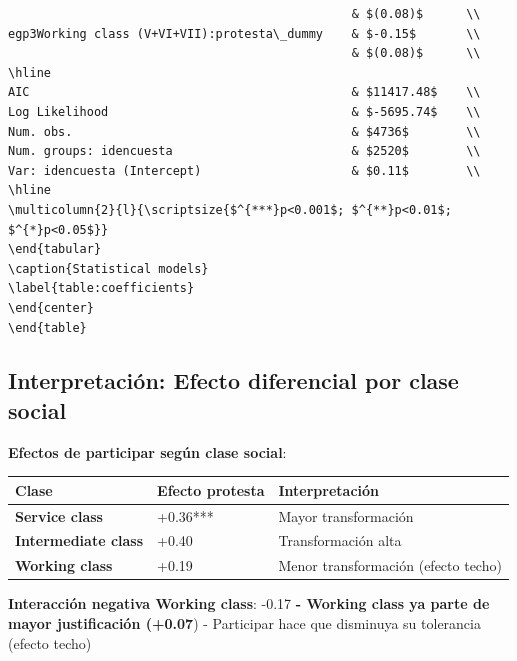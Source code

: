 \documentclass[
  12pt,
]{article}
\begin{document}
\begin{verbatim}
                                                & $(0.08)$      \\
egp3Working class (V+VI+VII):protesta\_dummy    & $-0.15$       \\
                                                & $(0.08)$      \\
\hline
AIC                                             & $11417.48$    \\
Log Likelihood                                  & $-5695.74$    \\
Num. obs.                                       & $4736$        \\
Num. groups: idencuesta                         & $2520$        \\
Var: idencuesta (Intercept)                     & $0.11$        \\
\hline
\multicolumn{2}{l}{\scriptsize{$^{***}p<0.001$; $^{**}p<0.01$; $^{*}p<0.05$}}
\end{tabular}
\caption{Statistical models}
\label{table:coefficients}
\end{center}
\end{table}
\end{verbatim}

\subsection{Interpretación: Efecto diferencial por clase
social}\label{interpretaciuxf3n-efecto-diferencial-por-clase-social}

\textbf{Efectos de participar según clase social}:

\begin{longtable}[]{@{}lll@{}}
\toprule\noalign{}
Clase & Efecto protesta & Interpretación \\
\midrule\noalign{}
\endhead
\bottomrule\noalign{}
\endlastfoot
\textbf{Service class} & +0.36*** & Mayor transformación \\
\textbf{Intermediate class} & +0.40 & Transformación alta \\
\textbf{Working class} & +0.19 & Menor transformación (efecto techo) \\
\end{longtable}

\textbf{Interacción negativa Working class}: -0.17\textbf{ - Working
class ya parte de mayor justificación (+0.07}) - Participar hace que
disminuya su tolerancia (efecto techo)
\end{document}

